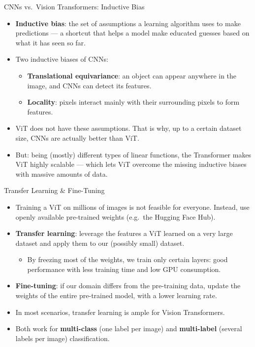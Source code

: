 \begin{frame}{CNNs vs.\ Vision Transformers: Inductive Bias}
\small%
\begin{itemize}
  \item \textbf{Inductive bias}: the set of assumptions a learning algorithm uses to make predictions --- a shortcut that helps a model make educated guesses based on what it has seen so far.
  \item Two inductive biases of CNNs:
  \begin{itemize}
    \item \textbf{Translational equivariance}: an object can appear anywhere in the image, and CNNs can detect its features.
    \item \textbf{Locality}: pixels interact mainly with their surrounding pixels to form features.
  \end{itemize}
  \item ViT does not have these assumptions. That is why, up to a certain dataset size, CNNs are actually better than ViT.
  \item But: being (mostly) different types of linear functions, the Transformer makes ViT highly scalable --- which lets ViT overcome the missing inductive biases with massive amounts of data.
\end{itemize}
\end{frame}

\begin{frame}{Transfer Learning \& Fine-Tuning}
\begin{itemize}
  \item Training a ViT on millions of images is not feasible for everyone. Instead, use openly available pre-trained weights (e.g.\ the Hugging Face Hub).
  \item \textbf{Transfer learning}: leverage the features a ViT learned on a very large dataset and apply them to our (possibly small) dataset.
  \begin{itemize}
    \item By freezing most of the weights, we train only certain layers: good performance with less training time and low GPU consumption.
  \end{itemize}
  \item \textbf{Fine-tuning}: if our domain differs from the pre-training data, update the weights of the entire pre-trained model, with a lower learning rate.
  \item In most scenarios, transfer learning is ample for Vision Transformers.
  \item Both work for \textbf{multi-class} (one label per image) and \textbf{multi-label} (several labels per image) classification.
\end{itemize}
\end{frame}

